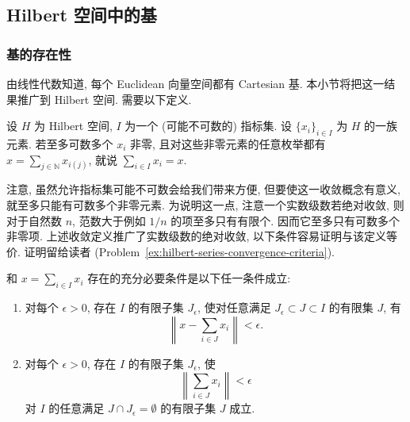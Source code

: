 \subsection{Hilbert 空间中的基}\label{sec:bases-hilbert-spaces}

\subsubsection{基的存在性}\label{subsec:hilbert-basis-existence}

由线性代数知道, 每个 Euclidean 向量空间都有 Cartesian 基. 本小节将把这一结果推广到 Hilbert 空间. 需要以下定义.

\begin{Definition}
\label{def:unordered-hilbert-series-sum}
设 $H$ 为 Hilbert 空间, $I$ 为一个 (可能不可数的) 指标集. 设 $\{x_i\}_{i\in I}$ 为 $H$ 的一族元素. 若至多可数多个 $x_i$ 非零, 且对这些非零元素的任意枚举都有 $x=\sum_{j\in\mathbb{N}}x_{i(j)}$, 就说 $\sum_{i\in I}x_i=x$.
\end{Definition}

\begin{Remark}
\label{rem:unordered-series-countability}
注意, 虽然允许指标集可能不可数会给我们带来方便, 但要使这一收敛概念有意义, 就至多只能有可数多个非零元素. 为说明这一点, 注意一个实数级数若绝对收敛, 则对于自然数 $n$, 范数大于例如 $1/n$ 的项至多只有有限个. 因而它至多只有可数多个非零项. 上述收敛定义推广了实数级数的绝对收敛, 以下条件容易证明与该定义等价. 证明留给读者 (Problem~\ref{ex:hilbert-series-convergence-criteria}).
\end{Remark}

\begin{Lemma}
\label{lem:unordered-hilbert-series-convergence-criteria}
和 $x=\sum_{i\in I}x_i$ 存在的充分必要条件是以下任一条件成立:\begin{enumerate}
\item 对每个 $\epsilon>0$, 存在 $I$ 的有限子集 $J_\epsilon$, 使对任意满足 $J_\epsilon\subset J\subset I$ 的有限集 $J$, 有
\begin{equation}\label{eq:hilbert-series-finite-sum-approximation}
\left\|x-\sum_{i\in J}x_i\right\|<\epsilon.
\end{equation}

\item 对每个 $\epsilon>0$, 存在 $I$ 的有限子集 $J_\epsilon$, 使
\begin{equation}\label{eq:hilbert-series-finite-tail-cauchy-condition}
\left\|\sum_{i\in J}x_i\right\|<\epsilon
\end{equation}
对 $I$ 的任意满足 $J\cap J_\epsilon=\emptyset$ 的有限子集 $J$ 成立.\end{enumerate}
\end{Lemma}

